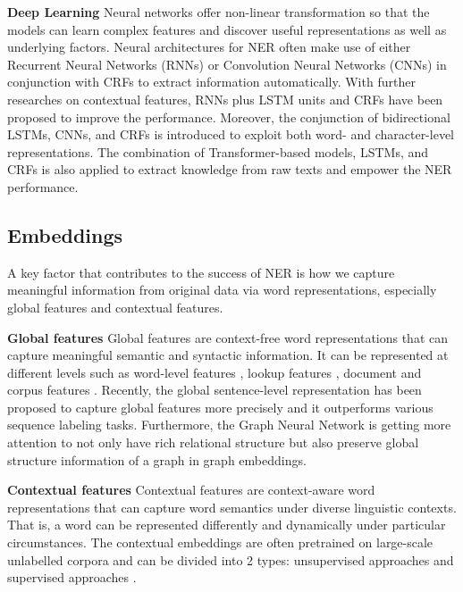 \documentclass[runningheads]{llncs}
\begin{document}
\noindent \textbf{Deep Learning}
Neural networks offer non-linear transformation so that the models can learn complex features and discover useful representations as well as underlying factors. Neural architectures for NER often make use of either Recurrent  Neural  Networks (RNNs)  or  Convolution  Neural  Networks (CNNs) in conjunction with  CRFs \cite{chiu2016named} to  extract information automatically. With further researches on contextual features, RNNs plus LSTM units and  CRFs have been proposed \cite{lample2016neural} to improve the performance.  Moreover, the conjunction of bidirectional LSTMs, CNNs, and CRFs \cite{ma2016end} is introduced to exploit both word- and character-level representations. The combination of Transformer-based models, LSTMs, and CRFs \cite{liu2018empower} is also applied to extract knowledge from raw texts and empower the NER performance. 
\vspace{-0.3cm}
\subsection{Embeddings}
A key factor that contributes to the success of NER is how we capture meaningful information from original data via word representations, especially global features and contextual features.

\noindent \textbf{Global features}
Global features are context-free word representations that can capture meaningful semantic and syntactic information. It can be represented at different levels such as word-level features \cite{liao2009simple}, lookup features \cite{hoffart2011robust}, document and corpus features \cite{ji2016joint}. 
Recently, the global sentence-level representation \cite{zhang-etal-2018-sentence} has been proposed to capture global features more precisely and it outperforms various sequence labeling tasks. Furthermore, the Graph Neural Network \cite{yao2019graph} is getting more attention to not only have rich relational structure but also preserve global structure information of a graph in graph embeddings. 

\noindent\textbf{Contextual features}
Contextual features are context-aware word representations that can capture word semantics under diverse linguistic contexts. That is, a word can be represented differently and dynamically under particular circumstances. The contextual embeddings are often pretrained on large-scale unlabelled corpora and can be divided into 2 types: unsupervised approaches \cite{lample2019cross,lan2019albert} and supervised approaches  \cite{subramanian2018learning}. 
\end{document}
